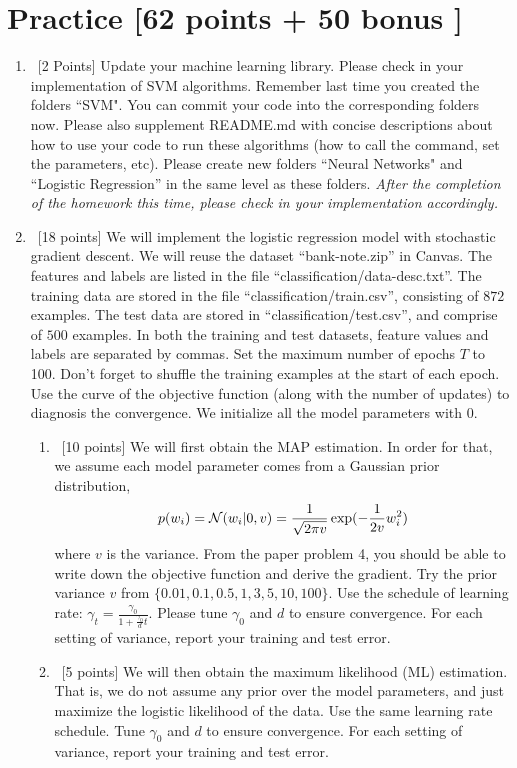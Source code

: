 \documentclass[12pt, fullpage,letterpaper]{article}
\begin{document}
\section{Practice [62 points + 50 bonus ]}
\begin{enumerate}
	\item~[2 Points] Update your machine learning library. Please check in your implementation of SVM algorithms. Remember last time you created the folders ``SVM". You can commit your code into the corresponding folders now. Please also supplement README.md with concise descriptions about how to use your code to run these algorithms (how to call the command, set the parameters, etc). Please create new folders ``Neural Networks" and ``Logistic Regression''  in the same level as these folders.  \textit{After the completion of the homework this time, please check in your implementation accordingly. }

	\item~[18 points] We will implement the logistic regression model with stochastic gradient descent. We will reuse the  dataset ``bank-note.zip'' in Canvas. The features and labels are listed in the file ``classification/data-desc.txt''. The training data are stored in the file ``classification/train.csv'', consisting of $872$ examples. The test data are stored in ``classification/test.csv'', and comprise of $500$ examples. In both the training and test datasets, feature values and labels are separated by commas. Set the maximum number of epochs $T$ to 100. Don't forget to shuffle the training examples at the start of each epoch. Use the curve of the objective function (along with the number of updates) to diagnosis the convergence. We initialize all the model parameters with $0$.
	\begin{enumerate}
		\item~[10 points] We will first obtain the MAP estimation. In order for that, we assume each model parameter comes from a Gaussian prior distribution, 
		\[
		p(w_i ) = \mathcal{N}(w_i |0, v)=\frac{1}{\sqrt{2\pi v}} \exp(-\frac{1}{2v}w_i^2)
		\]
		where $v$ is the variance.  From the paper problem 4, you should be able to write down  the objective function and derive the gradient. Try the prior variance $v$ from $\{0.01, 0.1, 0.5, 1, 3, 5, 10, 100\}$. 
		Use the schedule of learning rate: $\gamma_t = \frac{\gamma_0}{1+\frac{\gamma_0}{d}t}	$. Please tune $\gamma_0$ and $d$ to ensure convergence. For each setting of variance, report your training and test error. 
		\item~[5 points] We will then obtain the maximum likelihood (ML) estimation. That is, we do not assume any prior over the model parameters, and just maximize the logistic likelihood of the data. Use the same learning rate schedule. Tune $\gamma_0$ and $d$ to ensure convergence. For each setting of variance, report your training and test error. 
		

\end{enumerate}
\end{enumerate}
\end{document}
